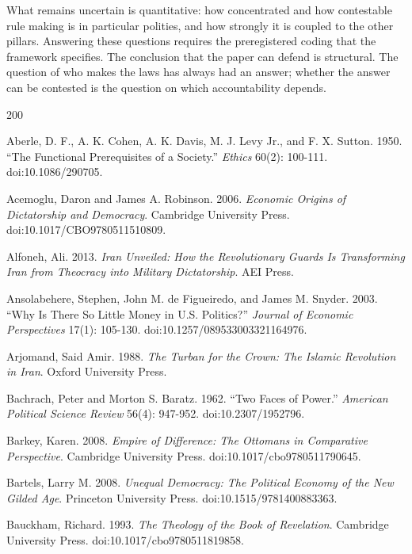 \documentclass[11pt,letterpaper]{article}
\theoremstyle{definition}
\theoremstyle{remark}
\begin{document}
What remains uncertain is quantitative: how concentrated and how contestable rule making is in particular polities, and how strongly it is coupled to the other pillars. Answering these questions requires the preregistered coding that the framework specifies. The conclusion that the paper can defend is structural. The question of who makes the laws has always had an answer; whether the answer can be contested is the question on which accountability depends.

\begin{thebibliography}{200}
\raggedright
\small
\setlength{\itemsep}{0pt}
Aberle, D. F., A. K. Cohen, A. K. Davis, M. J. Levy Jr., and F. X. Sutton. 1950. ``The Functional Prerequisites of a Society.'' \emph{Ethics} 60(2): 100-111. doi:10.1086/290705.

Acemoglu, Daron and James A. Robinson. 2006. \emph{Economic Origins of Dictatorship and Democracy}. Cambridge University Press. doi:10.1017/CBO9780511510809.

Alfoneh, Ali. 2013. \emph{Iran Unveiled: How the Revolutionary Guards Is Transforming Iran from Theocracy into Military Dictatorship}. AEI Press.

Ansolabehere, Stephen, John M. de Figueiredo, and James M. Snyder. 2003. ``Why Is There So Little Money in U.S. Politics?'' \emph{Journal of Economic Perspectives} 17(1): 105-130. doi:10.1257/089533003321164976.

Arjomand, Said Amir. 1988. \emph{The Turban for the Crown: The Islamic Revolution in Iran}. Oxford University Press.

Bachrach, Peter and Morton S. Baratz. 1962. ``Two Faces of Power.'' \emph{American Political Science Review} 56(4): 947-952. doi:10.2307/1952796.

Barkey, Karen. 2008. \emph{Empire of Difference: The Ottomans in Comparative Perspective}. Cambridge University Press. doi:10.1017/cbo9780511790645.

Bartels, Larry M. 2008. \emph{Unequal Democracy: The Political Economy of the New Gilded Age}. Princeton University Press. doi:10.1515/9781400883363.

Bauckham, Richard. 1993. \emph{The Theology of the Book of Revelation}. Cambridge University Press. doi:10.1017/cbo9780511819858.


\end{thebibliography}
\end{document}
